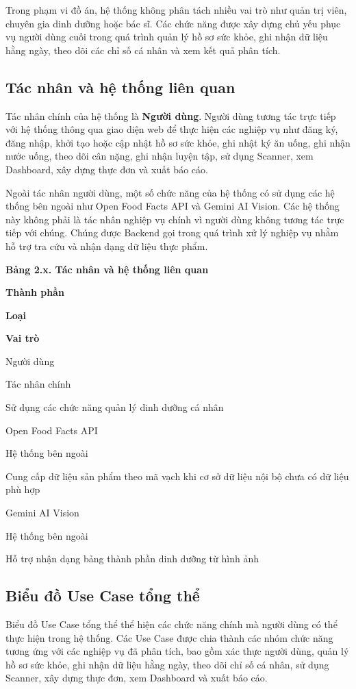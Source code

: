 \documentclass[12pt, a4paper]{report}
\begin{document}
Trong phạm vi đồ án, hệ thống không phân tách nhiều vai trò như quản trị viên, chuyên gia dinh dưỡng hoặc bác sĩ. Các chức năng được xây dựng chủ yếu phục vụ người dùng cuối trong quá trình quản lý hồ sơ sức khỏe, ghi nhận dữ liệu hằng ngày, theo dõi các chỉ số cá nhân và xem kết quả phân tích.

\subsection{Tác nhân và hệ thống liên quan}Tác nhân chính của hệ thống là \textbf{Người dùng}. Người dùng tương tác trực tiếp với hệ thống thông qua giao diện web để thực hiện các nghiệp vụ như đăng ký, đăng nhập, khởi tạo hoặc cập nhật hồ sơ sức khỏe, ghi nhật ký ăn uống, ghi nhận nước uống, theo dõi cân nặng, ghi nhận luyện tập, sử dụng Scanner, xem Dashboard, xây dựng thực đơn và xuất báo cáo.

Ngoài tác nhân người dùng, một số chức năng của hệ thống có sử dụng các hệ thống bên ngoài như Open Food Facts API và Gemini AI Vision. Các hệ thống này không phải là tác nhân nghiệp vụ chính vì người dùng không tương tác trực tiếp với chúng. Chúng được Backend gọi trong quá trình xử lý nghiệp vụ nhằm hỗ trợ tra cứu và nhận dạng dữ liệu thực phẩm.

\textbf{Bảng 2.x. Tác nhân và hệ thống liên quan}

\textbf{Thành phần}

\textbf{Loại}

\textbf{Vai trò}

Người dùng

Tác nhân chính

Sử dụng các chức năng quản lý dinh dưỡng cá nhân

Open Food Facts API

Hệ thống bên ngoài

Cung cấp dữ liệu sản phẩm theo mã vạch khi cơ sở dữ liệu nội bộ chưa có dữ liệu phù hợp

Gemini AI Vision

Hệ thống bên ngoài

Hỗ trợ nhận dạng bảng thành phần dinh dưỡng từ hình ảnh

\subsection{Biểu đồ Use Case tổng thể}Biểu đồ Use Case tổng thể thể hiện các chức năng chính mà người dùng có thể thực hiện trong hệ thống. Các Use Case được chia thành các nhóm chức năng tương ứng với các nghiệp vụ đã phân tích, bao gồm xác thực người dùng, quản lý hồ sơ sức khỏe, ghi nhận dữ liệu hằng ngày, theo dõi chỉ số cá nhân, sử dụng Scanner, xây dựng thực đơn, xem Dashboard và xuất báo cáo.
\end{document}
